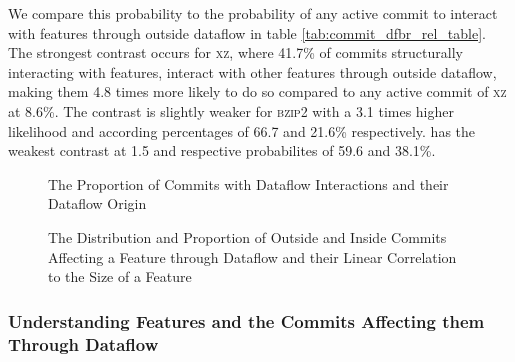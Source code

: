 We compare this probability to the probability of any active commit to interact with features through outside dataflow in table \ref{tab:commit_dfbr_rel_table}.
The strongest contrast occurs for \textsc{xz}, where 41.7\% of commits structurally interacting with features, interact with other features through outside dataflow, making them 4.8 times more likely to do so compared to any active commit of \textsc{xz} at 8.6\%.
The contrast is slightly weaker for \textsc{bzip2} with a 3.1 times higher likelihood and according percentages of 66.7 and 21.6\% respectively. 
 has the weakest contrast at 1.5 and respective probabilites of 59.6 and 38.1\%. 

\begin{figure}[htbp]
  \centering
  
  \caption{The Proportion of Commits with Dataflow Interactions and their Dataflow Origin}
  \label{fig:commit_dfbr_plot}
\end{figure}

\clearpage

\begin{figure}[htbp]
  \centering
  
  \caption{The Distribution and Proportion of Outside and Inside Commits Affecting a Feature through Dataflow and their Linear Correlation to the Size of a Feature}
  \label{fig:feature_dfbr_plot}
\end{figure}

\clearpage

\subsubsection*{Understanding Features and the Commits Affecting them Through Dataflow}\label{sec:eval_feature_dfbr}

